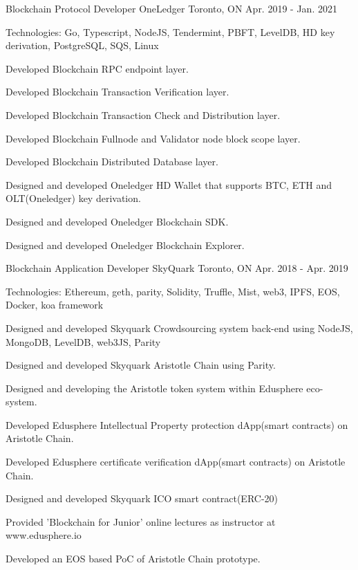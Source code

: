 \begin{cventries}
    \cventry
    {Blockchain Protocol Developer}
    {OneLedger}
    {Toronto, ON}
    {Apr. 2019 - Jan. 2021}
    {
      \begin{cvitems}
        \item {Technologies: Go, Typescript, NodeJS, Tendermint, PBFT, LevelDB, HD key derivation, PostgreSQL, SQS, Linux}
        \item {Developed Blockchain RPC endpoint layer.}
        \item {Developed Blockchain Transaction Verification layer.}
        \item {Developed Blockchain Transaction Check and Distribution layer.}
        \item {Developed Blockchain Fullnode and Validator node block scope layer.}
        \item {Developed Blockchain Distributed Database layer.}
        \item {Designed and developed Oneledger HD Wallet that supports BTC, ETH and OLT(Oneledger) key derivation.}
        \item {Designed and developed Oneledger Blockchain SDK.}
        \item {Designed and developed Oneledger Blockchain Explorer.}
      \end{cvitems}
    }

  \cventry
    {Blockchain Application Developer}
    {SkyQuark}
    {Toronto, ON}
    {Apr. 2018 - Apr. 2019}
    {
      \begin{cvitems}
        \item {Technologies: Ethereum, geth, parity, Solidity, Truffle, Mist, web3, IPFS, EOS, Docker, koa framework}
        \item {Designed and developed Skyquark Crowdsourcing system back-end using NodeJS, MongoDB, LevelDB, web3JS, Parity}
        \item {Designed and developed Skyquark Aristotle Chain using Parity.}
        \item {Designed and developing the Aristotle token system within Edusphere eco-system.}
        \item {Developed Edusphere Intellectual Property protection dApp(smart contracts) on Aristotle Chain.}
        \item {Developed Edusphere certificate verification dApp(smart contracts) on Aristotle Chain.}
        \item {Designed and developed Skyquark ICO smart contract(ERC-20)}
        \item {Provided 'Blockchain for Junior' online lectures as instructor at www.edusphere.io}
        \item {Developed an EOS based PoC of Aristotle Chain prototype.}
      \end{cvitems}
    }
	


\end{cventries}
